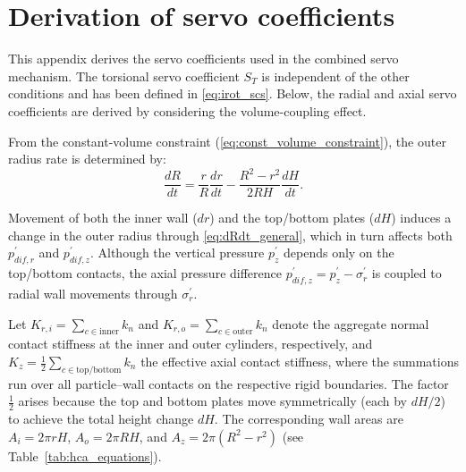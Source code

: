 \documentclass[a4paper,fleqn]{cas-sc}
\providecommand{\DIFaddend}{} %
\begin{document}
\DIFaddend \section{Derivation of servo coefficients}
\label{sec:appendix_servo}

This appendix derives the servo coefficients used in the combined servo mechanism. The torsional servo coefficient $S_T$ is independent of the other conditions and has been defined in \cref{eq:irot_scs}. Below, the radial and axial servo coefficients are derived by considering the volume-coupling effect.

From the constant-volume constraint (\cref{eq:const_volume_constraint}), the outer radius rate is determined by:
\begin{equation}
\frac{dR}{dt} = \frac{r}{R}\frac{dr}{dt} - \frac{R^2-r^2}{2RH}\frac{dH}{dt}.
\label{eq:dRdt_general}
\end{equation}

Movement of both the inner wall ($dr$) and the top/bottom plates ($dH$) induces a change in the outer radius through \cref{eq:dRdt_general}, which in turn affects both $p_{dif,r}^{\prime}$ and $p_{dif,z}^{\prime}$. Although the vertical pressure $p_z^{\prime}$ depends only on the top/bottom contacts, the axial pressure difference $p_{dif,z}^{\prime}=p_z^{\prime}-\sigma_r^{\prime}$ is coupled to radial wall movements through $\sigma_r^{\prime}$.

Let $K_{r,i}=\sum_{c\in\mathrm{inner}} k_n$ and $K_{r,o}=\sum_{c\in\mathrm{outer}} k_n$ denote the aggregate normal contact stiffness at the inner and outer cylinders, respectively, and $K_z=\frac{1}{2}\sum_{c\in\mathrm{top/bottom}} k_n$ the effective axial contact stiffness, where the summations run over all particle--wall contacts on the respective rigid boundaries. The factor $\frac{1}{2}$ arises because the top and bottom plates move symmetrically (each by $dH/2$) to achieve the total height change $dH$. The corresponding wall areas are $A_i=2\pi rH$, $A_o=2\pi RH$, and $A_z=2\pi(R^2-r^2)$ (see Table~\ref{tab:hca_equations}).
\end{document}
